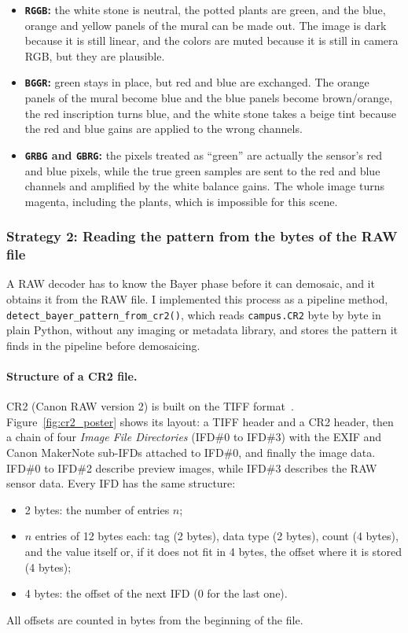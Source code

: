 \documentclass[a4paper]{article}
\begin{document}
\begin{itemize}
    \item \textbf{\texttt{RGGB}:} the white stone is neutral, the potted plants are green, and the blue, orange and yellow panels of the mural can be made out. The image is dark because it is still linear, and the colors are muted because it is still in camera RGB, but they are plausible.
    \item \textbf{\texttt{BGGR}:} green stays in place, but red and blue are exchanged. The orange panels of the mural become blue and the blue panels become brown/orange, the red inscription turns blue, and the white stone takes a beige tint because the red and blue gains are applied to the wrong channels.
    \item \textbf{\texttt{GRBG} and \texttt{GBRG}:} the pixels treated as ``green'' are actually the sensor's red and blue pixels, while the true green samples are sent to the red and blue channels and amplified by the white balance gains. The whole image turns magenta, including the plants, which is impossible for this scene.
\end{itemize}

\subsubsection{Strategy 2: Reading the pattern from the bytes of the RAW file}
\label{sec:cr2_bytes}
A RAW decoder has to know the Bayer phase before it can demosaic, and it obtains it from the RAW file. I implemented this process as a pipeline method, \texttt{detect\_bayer\_pattern\_from\_cr2()}, which reads \texttt{campus.CR2} byte by byte in plain Python, without any imaging or metadata library, and stores the pattern it finds in the pipeline before demosaicing.

\paragraph{Structure of a CR2 file.} CR2 (Canon RAW version 2) is built on the TIFF format~\cite{lclevy_cr2, libopenraw_cr2}. Figure~\ref{fig:cr2_poster} shows its layout: a TIFF header and a CR2 header, then a chain of four \emph{Image File Directories} (IFD\#0 to IFD\#3) with the EXIF and Canon MakerNote sub-IFDs attached to IFD\#0, and finally the image data. IFD\#0 to IFD\#2 describe preview images, while IFD\#3 describes the RAW sensor data. Every IFD has the same structure:
\begin{itemize}
    \item 2 bytes: the number of entries $n$;
    \item $n$ entries of 12 bytes each: tag (2 bytes), data type (2 bytes), count (4 bytes), and the value itself or, if it does not fit in 4 bytes, the offset where it is stored (4 bytes);
    \item 4 bytes: the offset of the next IFD ($0$ for the last one).
\end{itemize}
All offsets are counted in bytes from the beginning of the file.
\end{document}
